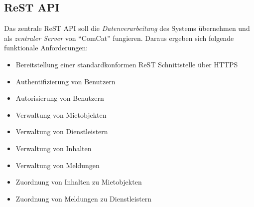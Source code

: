 \documentclass[a4paper]{article}
\begin{document}
	\subsection{ReST API}
	Das zentrale ReST API soll die \emph{Datenverarbeitung} des Systems übernehmen und als \emph{zentraler Server} von \enquote{ComCat} fungieren.
	Daraus ergeben sich folgende funktionale Anforderungen:
	\begin{itemize}
		\item	Bereitstellung einer standardkonformen ReST Schnittstelle über HTTPS
		\item Authentifizierung von Benutzern
		\item Autorisierung von Benutzern
		\item Verwaltung von Mietobjekten
		\item Verwaltung von Dienstleistern
		\item Verwaltung von Inhalten
		\item Verwaltung von Meldungen
		\item Zuordnung von Inhalten zu Mietobjekten
		\item Zuordnung von Meldungen zu Dienstleistern
	\end{itemize}
\end{document}
